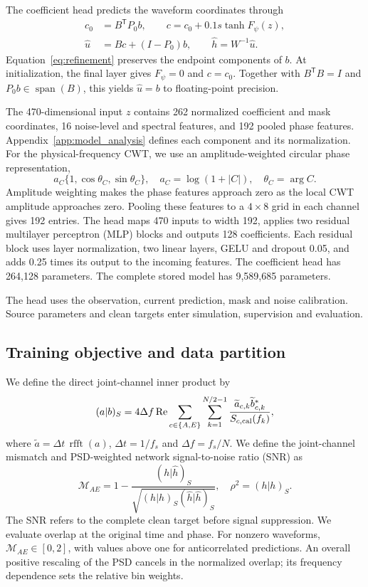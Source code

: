 \documentclass[10pt,prd,aps,a4paper,twocolumn,superscriptaddress,nofootinbib,floatfix]{revtex4-2}
\begin{document}
The coefficient head predicts the waveform coordinates through
\begin{align}
c_0&=B^{\mathsf T}P_0b,\qquad
c=c_0+0.1s\tanh F_\psi(z),\label{eq:refinement}\\
\widehat u&=Bc+(I-P_0)b,\qquad
\widehat h=W^{-1}\widehat u.\nonumber
\end{align}
Equation~\eqref{eq:refinement} preserves the endpoint components of $b$. At initialization, the final layer gives $F_\psi=0$ and $c=c_0$. Together with $B^{\mathsf T}B=I$ and $P_0b\in\operatorname{span}(B)$, this yields $\widehat u=b$ to floating-point precision.

The 470-dimensional input $z$ contains 262 normalized coefficient and mask coordinates, 16 noise-level and spectral features, and 192 pooled phase features. Appendix~\ref{app:model_analysis} defines each component and its normalization. For the physical-frequency CWT, we use an amplitude-weighted circular phase representation,
\begin{equation}
a_C\{1,\cos\theta_C,\sin\theta_C\},\quad
a_C=\log(1+|C|),\quad\theta_C=\arg C.\label{eq:continuous_phase}
\end{equation}
Amplitude weighting makes the phase features approach zero as the local CWT amplitude approaches zero. Pooling these features to a $4\times8$ grid in each channel gives 192 entries. The head maps 470 inputs to width 192, applies two residual multilayer perceptron (MLP) blocks and outputs 128 coefficients. Each residual block uses layer normalization, two linear layers, GELU and dropout 0.05, and adds 0.25 times its output to the incoming features. The coefficient head has 264,128 parameters. The complete stored model has 9,589,685 parameters.

The head uses the observation, current prediction, mask and noise calibration. Source parameters and clean targets enter simulation, supervision and evaluation.

\subsection{Training objective and data partition}\label{loss}
We define the direct joint-channel inner product by
\begin{equation}
(a|b)_S=4\Delta f\operatorname{Re}
\sum_{c\in\{A,E\}}\sum_{k=1}^{N/2-1}
\frac{\widetilde a_{c,k}\widetilde b_{c,k}^{*}}{S_{c,\rm cal}(f_k)},\label{eq:joint_inner}
\end{equation}
where $\widetilde a=\Delta t\,\operatorname{rfft}(a)$, $\Delta t=1/f_s$ and $\Delta f=f_s/N$. We define the joint-channel mismatch and PSD-weighted network signal-to-noise ratio (SNR) as
\begin{equation}
\mathcal M_{AE}=1-\frac{(h|\widehat h)_S}{\sqrt{(h|h)_S(\widehat h|\widehat h)_S}},\quad
\rho^2=(h|h)_S.\label{eq:joint_mismatch}
\end{equation}
The SNR refers to the complete clean target before signal suppression. We evaluate overlap at the original time and phase. For nonzero waveforms, $\mathcal M_{AE}\in[0,2]$, with values above one for anticorrelated predictions. An overall positive rescaling of the PSD cancels in the normalized overlap; its frequency dependence sets the relative bin weights.
\end{document}
